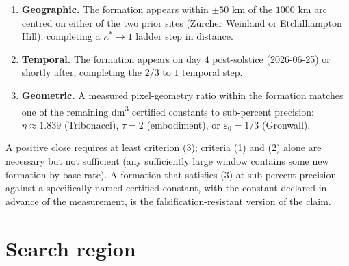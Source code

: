 \documentclass[11pt,a4paper]{article}
\begin{document}
\begin{enumerate}
  \item \textbf{Geographic.} The formation appears within $\pm 50$ km of the $1000$ km arc centred on either of the two prior sites (Z\"urcher Weinland or Etchilhampton Hill), completing a $\kappa^* \to 1$ ladder step in distance.
  \item \textbf{Temporal.} The formation appears on day $4$ post-solstice (2026-06-25) or shortly after, completing the $2/3$ to $1$ temporal step.
  \item \textbf{Geometric.} A measured pixel-geometry ratio within the formation matches one of the remaining dm\textsuperscript{3} certified constants to sub-percent precision: $\eta \approx 1.839$ (Tribonacci), $\tau = 2$ (embodiment), or $\varepsilon_0 = 1/3$ (Gronwall).
\end{enumerate}

A positive close requires at least criterion (3); criteria (1) and (2) alone are necessary but not sufficient (any sufficiently large window contains some new formation by base rate). A formation that satisfies (3) at sub-percent precision against a specifically named certified constant, with the constant declared in advance of the measurement, is the falsification-resistant version of the claim.

\section{Search region}
\end{document}
